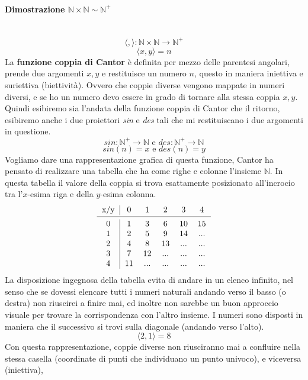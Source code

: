 \documentclass{article}
\begin{document}
\paragraph{Dimostrazione $\mathbb{N}\times\mathbb{N}\sim\mathbb{N}^+$}\mbox{}\\
$$\langle ,\rangle :\mathbb{N}\times\mathbb{N}\rightarrow\mathbb{N}^+$$
$$\langle x,y\rangle =n$$
La \textbf{funzione coppia di Cantor} è definita per mezzo delle parentesi
angolari, prende due argomenti $x,y$ e restituisce un numero $n$, questo
in maniera iniettiva e suriettiva (biettività).
\newline\newline
Ovvero che coppie diverse vengono mappate in numeri diversi, e se
ho un numero devo essere in grado di tornare alla stessa coppia $x,y$. Quindi esibiremo sia
l'andata della funzione coppia di Cantor che il ritorno, esibiremo anche i due proiettori
\textit{sin} e \textit{des} tali che mi restituiscano i due argomenti in questione.
$$sin:\mathbb{N}^+\rightarrow\mathbb{N}\text{ e }des:\mathbb{N}^+\rightarrow\mathbb{N}$$
$$sin(n)=x\text{ e }des(n)=y$$
Vogliamo dare una rappresentazione grafica di questa funzione, Cantor ha pensato di realizzare
una tabella che ha come righe e colonne l'insieme $\mathbb{N}$. In questa tabella
il valore della coppia si trova esattamente posizionato all'incrocio tra l'$x$-esima riga
e della $y$-esima colonna.
\[
    \begin{tabular}{c|ccccc}
        x/y & 0  & 1   & 2   & 3   & 4   \\
        \midrule
        0   & 1  & 3   & 6   & 10  & 15  \\
        1   & 2  & 5   & 9   & 14  & ... \\
        2   & 4  & 8   & 13  & ... & ... \\
        3   & 7  & 12  & ... & ... & ... \\
        4   & 11 & ... & ... & ... & ... \\
    \end{tabular}
\]
La disposizione ingegnosa della tabella evita di andare in un elenco infinito,
nel senso che se dovessi elencare tutti i numeri naturali andando verso il basso (o
destra) non riuscirei a finire mai, ed inoltre non sarebbe un buon approccio visuale per trovare
la corrispondenza con l'altro insieme. I numeri sono disposti in maniera che il successivo
si trovi sulla diagonale (andando verso l'alto).
$$\langle 2,1\rangle =8$$
Con questa rappresentazione, coppie diverse non riusciranno mai a confluire nella stessa
casella (coordinate di punti che individuano un punto univoco), e viceversa (iniettiva),
\end{document}
